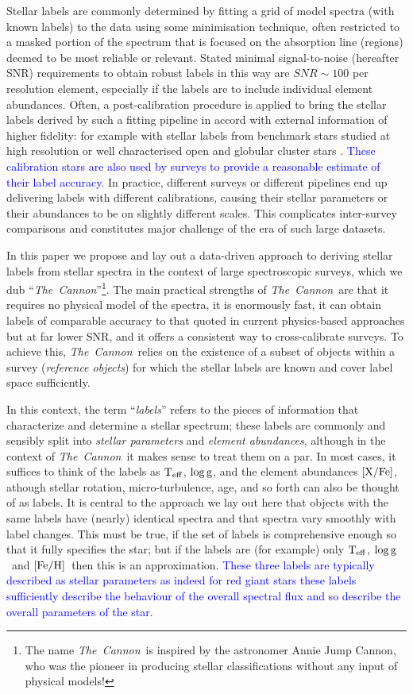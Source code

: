 \documentclass[12pt, preprint]{aastex}
\newcommand{\tc}{\textsl{The~Cannon}}
\newcommand{\teff}{\mbox{$\rm T_{eff}$}}
\newcommand{\feh}{\mbox{$\rm [Fe/H]$}}
\newcommand{\xfe}{\mbox{$\rm [X/Fe]$}}
\newcommand{\logg}{\mbox{$\rm \log g$}}
\begin{document}
Stellar labels are commonly determined by fitting a grid of model spectra (with known labels) to the data using some minimisation technique, often restricted to a masked portion of the spectrum that is focused on the absorption line (regions) deemed to be most reliable or relevant. 
Stated minimal signal-to-noise (hereafter SNR) requirements to obtain robust labels in this way are $SNR\sim 100$ per resolution element, especially if the labels are to include individual element abundances. 
Often, a post-calibration procedure is applied to bring the stellar labels derived by such a fitting pipeline in accord with external information of higher fidelity: for example with stellar labels from benchmark stars studied at high resolution or well characterised open and globular cluster stars \citep[e.g.,][]{Meszaros2013, Kord2013, Joffre2014}. \textcolor{blue}{These calibration stars are also used by surveys to provide a reasonable estimate of their label accuracy}. 
In practice, different surveys or different pipelines end up delivering labels with different calibrations,
causing their stellar parameters or their abundances to be on slightly different scales.
This complicates inter-survey comparisons and constitutes major challenge of the era of such large datasets. 

In this paper we propose and lay out a data-driven approach to deriving stellar labels from stellar spectra in the context of large spectroscopic surveys,
which we dub ``\tc''\footnote{The name \tc\ is inspired by the astronomer Annie Jump Cannon,
who was the pioneer in producing stellar classifications without any input of physical models!}.
The main practical strengths of \tc\ are that it requires no physical model of the spectra, it is enormously fast, it can obtain labels of comparable accuracy to that quoted in current physics-based approaches
 but at far lower SNR, and it offers a consistent way to cross-calibrate surveys. 
To achieve this, \tc\ relies on the existence of a subset of objects within a survey
(\textit{reference objects}) for which the stellar labels are known and cover label space sufficiently.

In this context, the term ``\emph{labels}'' refers to the pieces of information
that characterize and determine a stellar spectrum; these labels are commonly and sensibly split into \emph{stellar parameters} and \emph{element abundances}, although in the context of \tc\ it makes sense to treat them on a par. 
In most cases, it suffices to think of the labels as \teff , \logg, and the element abundances \xfe, athough stellar rotation, micro-turbulence, age, and so forth can also be thought of as labels.
It is central to the approach we lay out here that objects with the same labels have (nearly) identical spectra and that spectra vary smoothly with label changes. 
This must be true, if the set of labels is comprehensive enough so that it fully specifies the star; but if the labels are (for example) only \teff, \logg\ and \feh\ then this is an approximation. \textcolor{blue}{These three labels are typically described as stellar parameters as indeed for red giant stars these labels sufficiently describe the behaviour of the overall spectral flux and so describe the overall parameters of the star}. 
\end{document}
